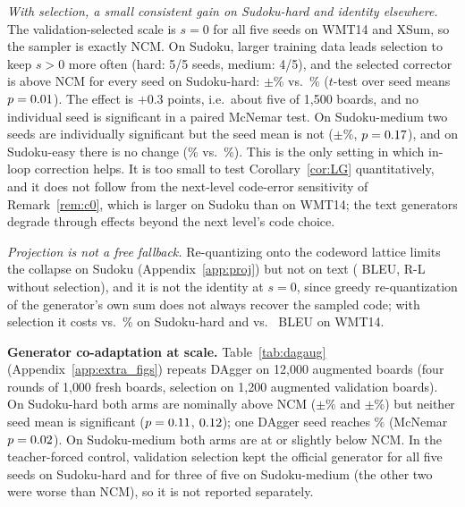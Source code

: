 \textit{With selection, a small consistent gain on Sudoku-hard and identity elsewhere.} The validation-selected scale is $s=0$ for all five seeds on WMT14 and XSum, so the sampler is exactly NCM. On Sudoku, larger training data leads selection to keep $s>0$ more often (hard: 5/5 seeds, medium: 4/5), and the selected corrector is above NCM for every seed on Sudoku-hard: \VfLoopSelHard$\pm$\VfLoopSelHardStd\% vs.\ \VfBaseHard\% ($t$-test over seed means $p=0.01$). The effect is $+0.3$ points, i.e.\ about five of 1{,}500 boards, and no individual seed is significant in a paired McNemar test. On Sudoku-medium two seeds are individually significant but the seed mean is not (\VfLoopSelMed$\pm$\VfLoopSelMedStd\%, $p=0.17$), and on Sudoku-easy there is no change (\VfLoopSelEasy\% vs.\ \VfBaseEasy\%). This is the only setting in which in-loop correction helps. It is too small to test Corollary~\ref{cor:LG} quantitatively, and it does not follow from the next-level code-error sensitivity of Remark~\ref{rem:c0}, which is larger on Sudoku than on WMT14; the text generators degrade through effects beyond the next level's code choice.

\textit{Projection is not a free fallback.} Re-quantizing onto the codeword lattice limits the collapse on Sudoku (Appendix~\ref{app:proj}) but not on text (\VfProjWmt{} BLEU, \VfProjXsum{} R-L without selection), and it is not the identity at $s=0$, since greedy re-quantization of the generator's own sum does not always recover the sampled code; with selection it costs \VfProjSelHard{} vs.\ \VfBaseHard\% on Sudoku-hard and \VfProjSelWmt{} vs.\ \VfBaseWmt{} BLEU on WMT14.

\textbf{Generator co-adaptation at scale.} Table~\ref{tab:dagaug} (Appendix~\ref{app:extra_figs}) repeats DAgger on 12{,}000 augmented boards (four rounds of 1{,}000 fresh boards, selection on 1{,}200 augmented validation boards). On Sudoku-hard both arms are nominally above NCM (\VaDagHard$\pm$\VaDagHardStd\% and \VaDagCHard$\pm$\VaDagCHardStd\%) but neither seed mean is significant ($p=0.11$, $0.12$); one DAgger seed reaches \VaDagHardMax\% (McNemar $p=0.02$). On Sudoku-medium both arms are at or slightly below NCM. In the teacher-forced control, validation selection kept the official generator for all five seeds on Sudoku-hard and for three of five on Sudoku-medium (the other two were worse than NCM), so it is not reported separately.



